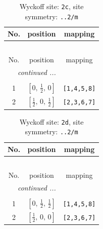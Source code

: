 \documentclass[fleqn,8pt]{jsarticle}
\begin{document}
\renewcommand{\arraystretch}{1.2}
\begin{longtable}{ccc}
\caption{Wyckoff site: {\tt 2c}, site symmetry: {\tt ..2/m}}
 \\
 \hline \hline
No. & position & mapping \\ \hline \endfirsthead

\multicolumn{2}{l}{\tablename\ \thetable{}} \\
 \hline \hline
No. & position & mapping \\ \hline \endhead

 \hline \hline
\multicolumn{2}{r}{\footnotesize\it continued ...} \\ \endfoot

 \hline \hline
\multicolumn{2}{r}{} \\ \endlastfoot

1 & $\left[ 0,\, \frac{1}{2},\, 0 \right]$ & {\tt [1,4,5,8]} \\ \hline
2 & $\left[ \frac{1}{2},\, 0,\, \frac{1}{2} \right]$ & {\tt [2,3,6,7]} \\
\end{longtable}
\renewcommand{\arraystretch}{1.2}
\begin{longtable}{ccc}
\caption{Wyckoff site: {\tt 2d}, site symmetry: {\tt ..2/m}}
 \\
 \hline \hline
No. & position & mapping \\ \hline \endfirsthead

\multicolumn{2}{l}{\tablename\ \thetable{}} \\
 \hline \hline
No. & position & mapping \\ \hline \endhead

 \hline \hline
\multicolumn{2}{r}{\footnotesize\it continued ...} \\ \endfoot

 \hline \hline
\multicolumn{2}{r}{} \\ \endlastfoot

1 & $\left[ 0,\, \frac{1}{2},\, \frac{1}{2} \right]$ & {\tt [1,4,5,8]} \\ \hline
2 & $\left[ \frac{1}{2},\, 0,\, 0 \right]$ & {\tt [2,3,6,7]} \\
\end{longtable}
\renewcommand{\arraystretch}{1.2}
\end{document}
